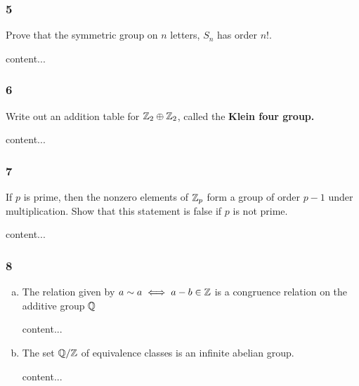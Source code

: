 \subsubsection*{5}
\begin{graybox}
	Prove that the symmetric group on $n$ letters, $S_n$ has order $n!$.
\end{graybox}
\begin{solution}
	content...
\end{solution}

\subsubsection*{6}
\begin{graybox}
	Write out an addition table for $\mathbb{Z}_2 \oplus \mathbb{Z}_2$, called the \textbf{Klein four group.}
\end{graybox}
\begin{solution}
	content...
\end{solution}

\subsubsection*{7}
\begin{graybox}
	If $p$ is prime, then the nonzero elements of $\mathbb{Z}_p$ form a group of order $p - 1$ under multiplication. Show that this statement is false if $p$ is not prime.
\end{graybox}
\begin{solution}
	content...
\end{solution}

\subsubsection*{8}
\begin{enumerate}[(a)]
	\item 
	\begin{graybox}
		The relation given by $a \sim a \iff a - b \in \mathbb{Z}$ is a congruence relation on the additive group $\mathbb{Q}$
	\end{graybox}
	\begin{solution}
		content...
	\end{solution}
	
	\item 
	\begin{graybox}
		The set $\mathbb{Q}/\mathbb{Z}$ of equivalence classes is an infinite abelian group.
	\end{graybox}
	\begin{solution}
		content...
	\end{solution}
\end{enumerate}

